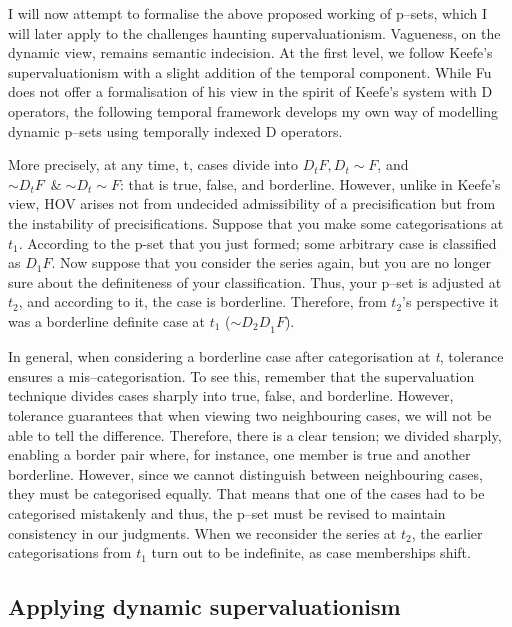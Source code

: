 I will now attempt to formalise the above proposed working of p--sets,
which I will later apply to the challenges haunting supervaluationism.
Vagueness, on the dynamic view, remains semantic indecision. At the
first level, we follow Keefe's supervaluationism with a slight addition
of the temporal component. While Fu does not offer a formalisation of
his view in the spirit of Keefe's system with D operators, the following
temporal framework develops my own way of modelling dynamic p--sets using
temporally indexed D operators.

More precisely, at any time, t, cases divide into
\(D_{t}F,D_{t}{\sim}F\), and \({{\sim}D}_{t}F\ \; \& \; {{\sim}D}_{t}{\sim}F\):
that is true, false, and borderline. However, unlike in Keefe's view,
HOV arises not from undecided admissibility of a precisification but
from the instability of precisifications. Suppose that you make some
categorisations at \(t_{1}\). According to the p-set that you just
formed; some arbitrary case is classified as \(D_{1}F\). Now suppose
that you consider the series again, but you are no longer sure about the
definiteness of your classification. Thus, your p--set is adjusted at
\(t_{2}\), and according to it, the case is borderline. Therefore, from
\(t_{2}\)'s perspective it was a borderline definite case at \(t_{1}\)
(\({{\sim}D_{2}D}_{1}F\)).

In general, when considering a borderline case after categorisation at
\emph{t}, tolerance ensures a mis--categorisation. To see this, remember
that the supervaluation technique divides cases sharply into true,
false, and borderline. However, tolerance guarantees that when viewing
two neighbouring cases, we will not be able to tell the difference.
Therefore, there is a clear tension; we divided sharply, enabling a
border pair where, for instance, one member is true and another
borderline. However, since we cannot distinguish between neighbouring
cases, they must be categorised equally. That means that one of the
cases had to be categorised mistakenly and thus, the p--set must be
revised to maintain consistency in our judgments. When we reconsider the
series at \(t_{2}\), the earlier categorisations from \(t_{1}\) turn out
to be indefinite, as case memberships shift.

\subsection{Applying dynamic supervaluationism}

